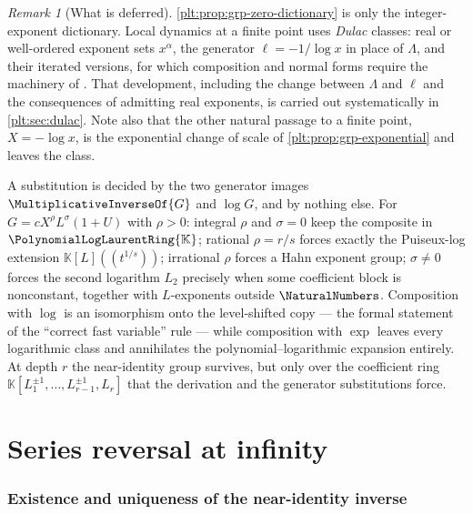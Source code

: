 \documentclass[11pt,oneside]{article}
\theoremstyle{plain}
\theoremstyle{definition}
\theoremstyle{remark}
\newtheorem{remark}[theorem]{Remark}
\newcommand{\K}{\mathbb{K}}
\newcommand{\PLlau}{\PolynomialLogLaurentRing{\K}}       %
\begin{document}
\begin{remark}[What is deferred]
\cref{plt:prop:grp-zero-dictionary} is only the integer-exponent dictionary.
Local dynamics at a finite point uses \emph{Dulac} classes: real or well-ordered
exponent sets \(x^{\alpha}\), the generator \(\ell=-1/\log x\) in place of
\(\Lambda\), and their iterated versions, for which composition and normal
forms require the machinery of
\cite{mardesic-normalforms,mardesic-length,resman-dulac,peran-logtransseries}.
That development, including the change between \(\Lambda\) and \(\ell\) and the
consequences of admitting real exponents, is carried out systematically in
\cref{plt:sec:dulac}.  Note also that the other natural passage to a finite
point, \(X=-\log x\), is the exponential change of scale of
\cref{plt:prop:grp-exponential} and leaves the class.
\end{remark}

\begin{summarybox}
A substitution is decided by the two generator images
\(\MultiplicativeInverseOf{G}\) and \(\log G\), and by nothing else.  For
\(G=cX^{\rho}L^{\sigma}(1+U)\) with \(\rho>0\): integral \(\rho\) and
\(\sigma=0\) keep the composite in \(\PLlau\); rational \(\rho=r/s\) forces
exactly the Puiseux-log extension \(\K[L]((t^{1/s}))\); irrational \(\rho\)
forces a Hahn exponent group; \(\sigma\ne0\) forces the second logarithm
\(L_2\) precisely when some coefficient block is nonconstant, together with
\(L\)-exponents outside \(\NaturalNumbers\).  Composition with \(\log\) is an
isomorphism onto the level-shifted copy --- the formal statement of the
``correct fast variable'' rule --- while composition with \(\exp\) leaves every
logarithmic class and annihilates the polynomial--logarithmic expansion
entirely.  At depth \(r\) the near-identity group survives, but only over the
coefficient ring \(\K[L_1^{\pm1},\ldots,L_{r-1}^{\pm1},L_r]\) that the
derivation and the generator substitutions force.
\end{summarybox}

\clearpage
\part{Series reversal at infinity}

\section{Existence and uniqueness of the near-identity inverse}
\label{plt:sec:reversion-existence}
\end{document}
